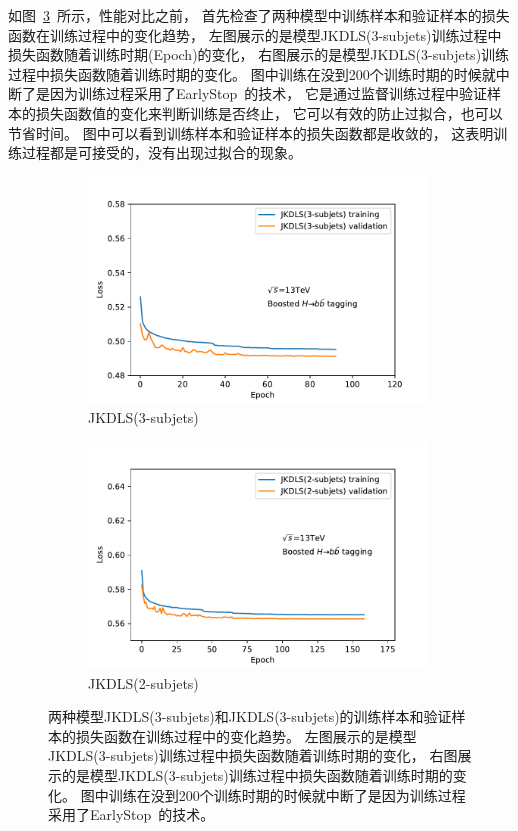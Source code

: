如图~\ref{fig:SUBLOSS}~所示，性能对比之前，
首先检查了两种模型中训练样本和验证样本的损失函数在训练过程中的变化趋势，
左图展示的是模型JKDLS(3-subjets)训练过程中损失函数随着训练时期(Epoch)的变化，
右图展示的是模型JKDLS(3-subjets)训练过程中损失函数随着训练时期的变化。
图中训练在没到200个训练时期的时候就中断了是因为训练过程采用了EarlyStop~\cite{EarlyStop}的技术，
它是通过监督训练过程中验证样本的损失函数值的变化来判断训练是否终止，
它可以有效的防止过拟合，也可以节省时间。
图中可以看到训练样本和验证样本的损失函数都是收敛的，
这表明训练过程都是可接受的，没有出现过拟合的现象。

\begin{figure}[htbp]
  \begin{subfigure}{.5\textwidth}
  \centering
   \includegraphics[width=0.99\textwidth]{figuresXbb/Subjet/SUB3Loss.pdf}
   \caption{JKDLS(3-subjets)}
   \label{fig:}
  \end{subfigure}
  \begin{subfigure}{.5\textwidth}
  \centering
   \includegraphics[width=0.99\textwidth]{figuresXbb/Subjet/SUB2Loss.pdf}
   \caption{JKDLS(2-subjets)}
   \label{fig:}
  \end{subfigure}
  \caption{ 
 两种模型JKDLS(3-subjets)和JKDLS(3-subjets)的训练样本和验证样本的损失函数在训练过程中的变化趋势。
左图展示的是模型JKDLS(3-subjets)训练过程中损失函数随着训练时期的变化，
右图展示的是模型JKDLS(3-subjets)训练过程中损失函数随着训练时期的变化。
图中训练在没到200个训练时期的时候就中断了是因为训练过程采用了EarlyStop~\cite{EarlyStop}的技术。
   }
  \label{fig:SUBLOSS}
\end{figure} 

